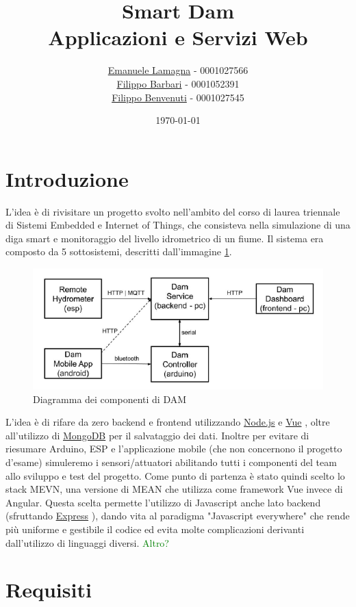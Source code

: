 \documentclass[a4paper,12pt]{report}
\title{
    Smart Dam \\
    \large Applicazioni e Servizi Web
}
\author{\href{mailto:emanuele.lamagna@studio.unibo.it}{Emanuele Lamagna} - 0001027566\\\href{mailto:filippo.barbari@studio.unibo.it}{Filippo Barbari} - 0001052391\\\href{mailto:filippo.benvenuti3@studio.unibo.it}{Filippo Benvenuti} - 0001027545}
\date{\today}
\newcommand{\node}{\href{https://nodejs.org/it/}{Node.js} }
\newcommand{\vue}{\href{https://vuejs.org/}{Vue} }
\newcommand{\express}{\href{https://expressjs.com/it/}{Express} }
\newcommand{\mongodb}{\href{https://www.mongodb.com/it-it}{MongoDB} }
\begin{document}
\maketitle
\clearpage
\tableofcontents
\clearpage

\chapter*{Introduzione}\label{sec:intro}
L'idea è di rivisitare un progetto svolto nell'ambito del corso di laurea triennale di Sistemi Embedded e Internet of Things, che consisteva nella simulazione di una diga smart e monitoraggio del livello idrometrico di un fiume. Il sistema era composto da 5 sottosistemi, descritti dall'immagine \ref{fig:dam-scheme}.
\begin{figure}[h!]
	\centering
	\includegraphics[scale=0.7]{dam-scheme.png}
	\caption{Diagramma dei componenti di DAM}
	\label{fig:dam-scheme}
\end{figure}
L'idea è di rifare da zero backend e frontend utilizzando \node e \vue, oltre all'utilizzo di \mongodb per il salvataggio dei dati. Inoltre per evitare di riesumare Arduino, ESP e l'applicazione mobile (che non concernono il progetto d'esame) simuleremo i sensori/attuatori abilitando tutti i componenti del team allo sviluppo e test del progetto.
Come punto di partenza è stato quindi scelto lo stack MEVN, una versione di MEAN che utilizza come framework Vue invece di Angular. Questa scelta permette l'utilizzo di Javascript anche lato backend (sfruttando \express), dando vita al paradigma "Javascript everywhere" che rende più uniforme e gestibile il codice ed evita molte complicazioni derivanti dall'utilizzo di linguaggi diversi. 
\textcolor{green}{Altro?}
\clearpage

\chapter{Requisiti}\label{sec:requirements}
\end{document}
